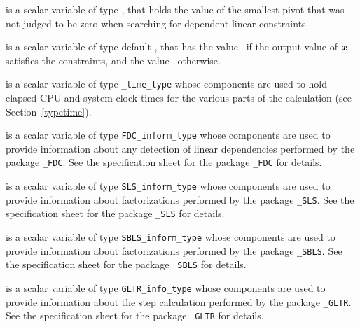 \begin{description}
 is a scalar variable of type \realdp,
that holds the value of the smallest pivot that was not judged to be zero
when searching for dependent linear constraints.

 is a scalar variable of type default \logical, that has the
value \true\ if the output value of ${\bm{x}}$ satisfies the constraints,
and the value \false\ otherwise.

 is a scalar variable of type {\tt \packagename\_time\_type}
whose components are used to hold elapsed CPU and system clock times for the
various parts of the calculation (see Section~\ref{typetime}).

 is a scalar variable of type
{\tt FDC\_inform\_type}
whose components are used to provide information about
any detection of linear dependencies
performed by the package
{\tt \libraryname\_FDC}.
See the specification sheet for the package
{\tt \libraryname\_FDC} for details.

 is a scalar variable of type
{\tt SLS\_inform\_type}
whose components are used to provide information about factorizations
performed by the package
{\tt \libraryname\_SLS}.
See the specification sheet for the package
{\tt \libraryname\_SLS} for details.

 is a scalar variable of type
{\tt SBLS\_inform\_type}
whose components are used to provide information about factorizations
performed by the package
{\tt \libraryname\_SBLS}.
See the specification sheet for the package
{\tt \libraryname\_SBLS} for details.

 is a scalar variable of type
{\tt GLTR\_info\_type}
whose components are used to provide information about
the step calculation performed by the package
{\tt \libraryname\_GLTR}.
See the specification sheet for the package
{\tt \libraryname\_GLTR} for details.

\end{description}
